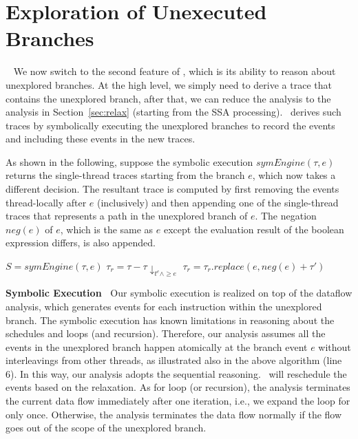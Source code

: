 \section{Exploration of Unexecuted Branches}~\label{sec:relax2}
We now switch to the second feature of \tool, which is its ability to reason about unexplored branches.
At the high level, we simply need to derive a trace that contains the unexplored branch, after that, we can reduce the analysis to the analysis in Section~\ref{sec:relax} (starting from the SSA processing).  \tool\ derives such traces by symbolically executing the unexplored branches to record the events and including these events in the new traces.


As shown in the following, suppose the symbolic execution  $symEngine(\tau, e)$ returns the single-thread traces starting from the branch $e$, which now takes a different decision. The resultant trace is computed by first removing the events thread-locally after $e$ (inclusively) and then appending one of the single-thread traces that represents a path in the unexplored branch of $e$. The negation $neg(e)$ of $e$, which is the same as $e$ except the evaluation result of the boolean expression differs, is also appended.



\begin{algorithmic}[3]
    \State $S=symEngine(\tau, e)$
	\State $\tau_r=\tau-\tau\downarrow_{t^e \wedge \geq e}$
	\State $\tau_r=\tau_r.replace(e, neg(e) + \tau')$
	\EndFor
 \EndIf
\EndFor
\end{algorithmic}


{\bf Symbolic Execution\ } Our symbolic execution is realized on top of the dataflow analysis, which generates events for each instruction within the unexplored branch.
The symbolic execution has known limitations in reasoning about the schedules and loops (and recursion). Therefore, our analysis assumes all the events in the unexplored branch happen atomically at the branch event $e$ without interleavings from other threads, as illustrated also in the above algorithm (line 6). In this way, our analysis adopts the sequential reasoning. \tool\ will reschedule the events based on the relaxation. As for loop (or recursion), the analysis terminates the current data flow immediately after one iteration, i.e., we expand the loop for only once. Otherwise, the analysis terminates the data flow normally if the flow goes out of the scope of the unexplored branch.

